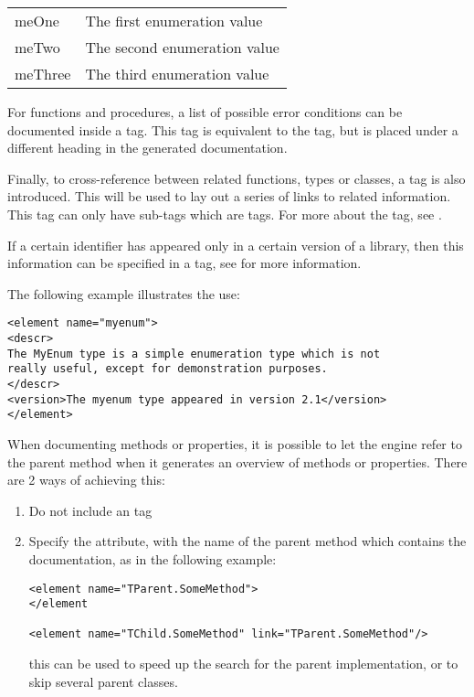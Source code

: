 \begin{tabularx}{\textwidth}{lX}
meOne & The first enumeration value \\
meTwo & The second enumeration value \\
meThree & The third enumeration value \\
\end{tabularx}

For functions and procedures, a list of possible error conditions can be
documented inside a  tag. This tag is equivalent to the
 tag, but is placed under a different heading in the generated
documentation.

Finally, to cross-reference between related functions, types or classes, a
 tag is also introduced. This will be used to lay out a series
of links to related information. This tag can only have sub-tags which are
 tags. For more about the  tag, see .

If a certain identifier has appeared only in a certain version of a library,
then this information can be specified in a  tag, see
 for more information.

The following example illustrates the use:
\begin{verbatim}
<element name="myenum">
<descr>
The MyEnum type is a simple enumeration type which is not
really useful, except for demonstration purposes.
</descr>
<version>The myenum type appeared in version 2.1</version>
</element>
\end{verbatim}

When documenting methods or properties, it is possible to let the  engine
refer to the parent method when it generates an overview of methods or
properties. There are 2 ways of achieving this: 
\begin{enumerate}
\item Do not include an  tag
\item Specify the  attribute, with the name of the parent
method which contains the documentation, as in the following example:
\begin{verbatim}
<element name="TParent.SomeMethod">
</element

<element name="TChild.SomeMethod" link="TParent.SomeMethod"/>
\end{verbatim}
this can be used to speed up the search for the parent implementation,
or to skip several parent classes.
\end{enumerate}

